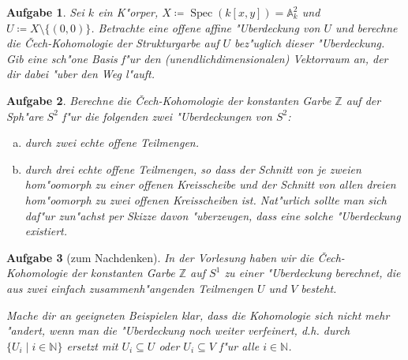 \documentclass[paper = A4, fontsize=12pt, numbers=noendperiod, chapterprefix=true]{scrbook}
\theoremstyle{break}
\newtheorem{Aufg}{Aufgabe}
\theoremstyle{nonumberbreak}
\theoremstyle{nonumberplain}
\DeclareMathOperator{\Spec}{Spec}
\newcommand{\A}{\mathbb{A}}
\newcommand{\N}{\mathbb{N}}
\newcommand{\Z}{\mathbb{Z}}
\begin{document}
\begin{Aufg}
Sei $k$ ein K"orper, $X \coloneqq \Spec(k[x,y]) = \A^2_k$ und $U \coloneqq X \setminus \{(0,0)\}$. 
Betrachte eine offene affine "Uberdeckung von $U$ und berechne die \v{C}ech-Kohomologie der Strukturgarbe auf $U$ bez"uglich dieser "Uberdeckung. Gib eine sch"one Basis f"ur den (unendlichdimensionalen) Vektorraum an, der dir dabei "uber den Weg l"auft.
\end{Aufg}

\begin{Aufg}
Berechne die \v{C}ech-Kohomologie der konstanten Garbe $\Z$ auf der Sph"are $S^2$ f"ur die folgenden zwei "Uberdeckungen von $S^2$:
\begin{enumerate}[a)]
 \item durch zwei echte offene Teilmengen.
 \item durch drei echte offene Teilmengen, so dass der Schnitt von je zweien hom"oomorph zu einer offenen Kreisscheibe und der Schnitt von allen dreien hom"oomorph zu zwei offenen Kreisscheiben ist. Nat"urlich sollte man sich daf"ur zun"achst per Skizze davon "uberzeugen, dass eine solche "Uberdeckung existiert.
\end{enumerate}
\end{Aufg}

\begin{Aufg}[zum Nachdenken]
In der Vorlesung haben wir die \v{C}ech-Kohomologie der konstanten Garbe $\Z$ auf $S^1$ zu einer "Uberdeckung berechnet, die aus zwei einfach zusammenh"angenden Teilmengen $U$ und $V$ besteht.

Mache dir an geeigneten Beispielen klar, dass die Kohomologie sich nicht mehr "andert, wenn man die "Uberdeckung noch weiter verfeinert, d.h. durch $\{U_i \mid i \in \N\}$ ersetzt mit $U_i \subseteq U$ oder $U_i \subseteq V$ f"ur alle $i \in \N$.
\end{Aufg}
\end{document}
